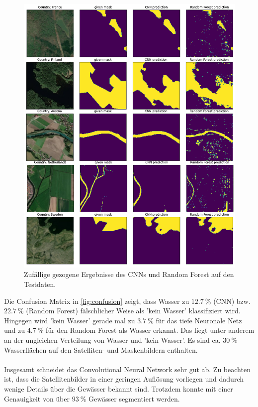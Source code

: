 \begin{figure}
    \centering
    \includegraphics[width=\textwidth]{content/img/ergebnisse_bilder.png}
    \caption{Zufällige gezogene Ergebnisse des CNNs und Random Forest auf den Testdaten.\cite{mapbox}\cite{openstreetmap}}
    \label{fig:ergebnisse_bilder}
\end{figure}
Die Confusion Matrix in \autoref{fig:confusion} zeigt, dass Wasser zu $\SI{12.7}{\percent}$ (CNN) bzw. $\SI{22.7}{\percent}$ (Random Forest) fälschlicher Weise als 'kein Wasser' klassifiziert wird.
Hingegen wird 'kein Wasser' gerade mal zu $\SI{3.7}{\percent}$ für das tiefe Neuronale Netz und zu $\SI{4.7}{\percent}$ für den Random Forest als Wasser erkannt.
Das liegt unter anderem an der ungleichen Verteilung von Wasser und 'kein Wasser'.
Es sind ca. $\SI{30}{\percent}$ Wasserflächen auf den Satelliten- und Maskenbildern enthalten.
\\
\\
Insgesamt schneidet das Convolutional Neural Network sehr gut ab.
Zu beachten ist, dass die Satellitenbilder in einer geringen Auflösung vorliegen und dadurch wenige Details über die Gewässer bekannt sind.
Trotzdem konnte mit einer Genauigkeit von über $\SI{93}{\percent}$ Gewässer segmentiert werden.
